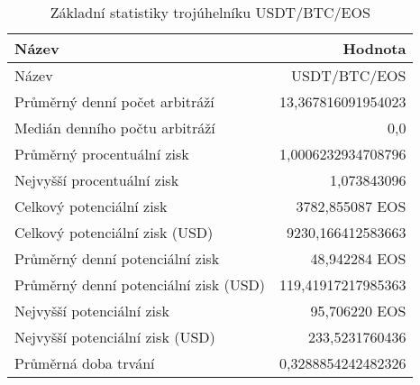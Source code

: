 \begin{table}\centering
\caption{Základní statistiky trojúhelníku USDT/BTC/EOS}
\label{USDTBTCEOS_stats}
\begin{tabular}{|| l | r ||}
\hline Název & Hodnota \\ 
\hline\hline Název & USDT/BTC/EOS \\ 
\hline Průměrný denní počet arbitráží & 13,367816091954023 \\ 
\hline Medián denního počtu arbitráží & 0,0 \\ 
\hline Průměrný procentuální zisk & 1,0006232934708796 \\ 
\hline Nejvyšší procentuální zisk & 1,073843096 \\ 
\hline Celkový potenciální zisk & 3782,855087 EOS \\ 
\hline Celkový potenciální zisk (USD) & 9230,166412583663 \\ 
\hline Průměrný denní potenciální zisk & 48,942284 EOS \\ 
\hline Průměrný denní potenciální zisk (USD) & 119,41917217985363 \\ 
\hline Nejvyšší potenciální zisk & 95,706220 EOS \\ 
\hline Nejvyšší potenciální zisk (USD) & 233,5231760436 \\ 
\hline Průměrná doba trvání & 0,3288854242482326 \\ 
\hline
\end{tabular}
\end{table}